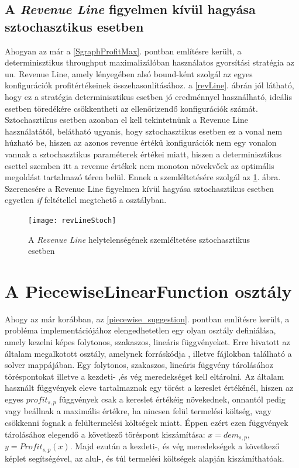 \subsection{A \textit{Revenue Line} figyelmen kívül hagyása sztochasztikus esetben}
Ahogyan az már a \ref{SgraphProfitMax}. pontban említésre került, a determinisztikus throughput maximalizálóban használatos gyorsítási stratégia az un. Revenue Line, amely lényegében alsó bound-ként szolgál az egyes konfigurációk profitértékeinek összehasonlításához.
a \ref{revLine}. ábrán jól látható, hogy ez a stratégia determinisztikus esetben jó eredménnyel használható, ideális esetben töredékére csökkentheti az ellenőrizendő konfigurációk számát.
Sztochasztikus esetben azonban el kell tekintetnünk a Revenue Line használatától, belátható ugyanis, hogy sztochasztikus esetben ez a vonal nem húzható be, hiszen az azonos revenue értékű konfigurációk nem egy vonalon vannak a sztochasztikus paraméterek értékei miatt, hiszen a determinisztikus esettel szemben itt a revenue értékek nem monoton növekvőek az optimális megoldást tartalmazó téren belül.
Ennek a szemléltetésére szolgál az \ref{revLineStoch}. ábra.
Szerencsére a Revenue Line figyelmen kívül hagyása sztochasztikus esetben egyetlen \textit{if} feltétellel megtehető a  osztályban.
\begin{figure}[H]
\begin{center}
\texttt{[image: revLineStoch]}
\caption{A \textit{Revenue Line} helytelenségének szemléltetése sztochasztikus esetben}
\label{revLineStoch}
\end{center}
\end{figure} 
\section{A PiecewiseLinearFunction osztály} \label{piecewise_class}
Ahogy az már korábban, az \ref{piecewise_suggestion}. pontban említésre került, a probléma implementációjához elengedhetetlen egy olyan osztály definiálása, amely kezelni képes folytonos, szakaszos, lineáris függvényeket.
Erre hivatott az általam megalkotott  osztály, amelynek forráskódja , illetve  fájlokban található a solver  mappájában.
Egy folytonos, szakaszos, lineáris függvény tárolásához töréspontokat illetve a kezdeti- ,és vég meredekséget kell eltárolni.
Az általam használt függvények eleve tartalmaznak egy törést a kereslet értékénél, hiszen az egyes $profit_{s,p}$ függvények csak a kereslet értékéig növekednek, onnantól pedig vagy beállnak a maximális értékre, ha nincsen felül termelési költség, vagy csökkenni fognak a felültermelési költségek miatt.
Éppen ezért ezen függvények tárolásához elegendő a következő töréspont kiszámítása: $x=dem_{s,p}$, $y=Profit_{s,p}(x)$. 
Majd ezután a kezdeti-, és vég meredekségek a következő képlet segítségével, az alul-, és túl termelési költségek alapján kiszámíthatóak.

